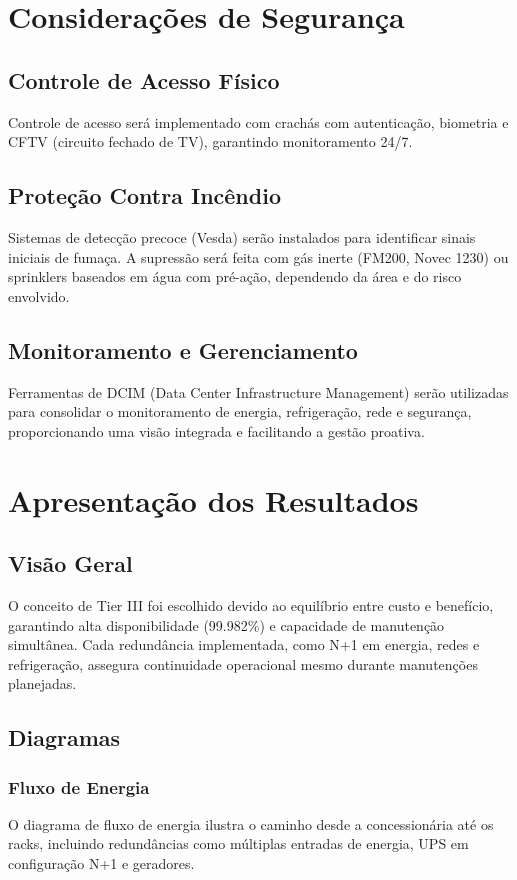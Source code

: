 \documentclass[
	12pt,				%
	oneside,			%
	a4paper,			%
	english,			%
	brazil				%
	]{abntex2unama}
\begin{document}
\chapter{Considerações de Segurança}
\section{Controle de Acesso Físico}
Controle de acesso será implementado com crachás com autenticação, biometria e CFTV (circuito fechado de TV), garantindo monitoramento 24/7.

\section{Proteção Contra Incêndio}
Sistemas de detecção precoce (Vesda) serão instalados para identificar sinais iniciais de fumaça. A supressão será feita com gás inerte (FM200, Novec 1230) ou sprinklers baseados em água com pré-ação, dependendo da área e do risco envolvido.

\section{Monitoramento e Gerenciamento}
Ferramentas de DCIM (Data Center Infrastructure Management) serão utilizadas para consolidar o monitoramento de energia, refrigeração, rede e segurança, proporcionando uma visão integrada e facilitando a gestão proativa.

\chapter{Apresentação dos Resultados}
\section{Visão Geral}
O conceito de Tier III foi escolhido devido ao equilíbrio entre custo e benefício, garantindo alta disponibilidade (99.982\%) e capacidade de manutenção simultânea. Cada redundância implementada, como N+1 em energia, redes e refrigeração, assegura continuidade operacional mesmo durante manutenções planejadas.

\section{Diagramas}
\subsection{Fluxo de Energia}
O diagrama de fluxo de energia ilustra o caminho desde a concessionária até os racks, incluindo redundâncias como múltiplas entradas de energia, UPS em configuração N+1 e geradores.
\end{document}
